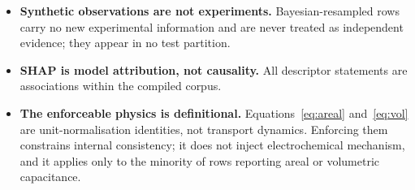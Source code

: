 \begin{itemize}
\item \textbf{Synthetic observations are not experiments.} Bayesian-resampled rows carry no
new experimental information and are never treated as independent evidence; they appear in no
test partition.

\item \textbf{SHAP is model attribution, not causality.} All descriptor statements are
associations within the compiled corpus.

\item \textbf{The enforceable physics is definitional.} Equations~\eqref{eq:areal}
and~\eqref{eq:vol} are unit-normalisation identities, not transport dynamics. Enforcing them
constrains internal consistency; it does not inject electrochemical mechanism, and it applies
only to the minority of rows reporting areal or volumetric capacitance.
\end{itemize}
